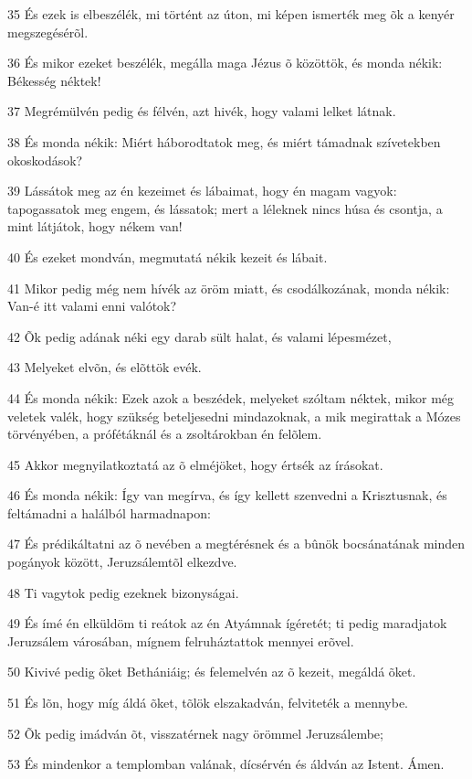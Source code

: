 \par 35 És ezek is elbeszélék, mi történt az úton, mi képen ismerték meg õk a kenyér megszegésérõl.
\par 36 És mikor ezeket beszélék, megálla maga Jézus õ közöttök, és monda nékik: Békesség néktek!
\par 37 Megrémülvén pedig és félvén, azt hivék, hogy valami lelket látnak.
\par 38 És monda nékik: Miért háborodtatok meg, és miért támadnak szívetekben okoskodások?
\par 39 Lássátok meg az én kezeimet és lábaimat, hogy én magam vagyok: tapogassatok meg engem, és lássatok; mert a léleknek nincs húsa és csontja, a mint látjátok, hogy nékem van!
\par 40 És ezeket mondván, megmutatá nékik kezeit és lábait.
\par 41 Mikor pedig még nem hívék az öröm miatt, és csodálkozának, monda nékik: Van-é itt valami enni valótok?
\par 42 Õk pedig adának néki egy darab sült halat, és valami lépesmézet,
\par 43 Melyeket elvõn, és elõttök evék.
\par 44 És monda nékik: Ezek azok a beszédek, melyeket szóltam néktek, mikor még veletek valék, hogy szükség beteljesedni mindazoknak, a mik megirattak a Mózes törvényében, a prófétáknál és a zsoltárokban én felõlem.
\par 45 Akkor megnyilatkoztatá az õ elméjöket, hogy értsék az írásokat.
\par 46 És monda nékik: Így van megírva, és így kellett szenvedni a Krisztusnak, és feltámadni a halálból harmadnapon:
\par 47 És prédikáltatni az õ nevében a megtérésnek és a bûnök bocsánatának minden pogányok között, Jeruzsálemtõl elkezdve.
\par 48 Ti vagytok pedig ezeknek bizonyságai.
\par 49 És ímé én elküldöm ti reátok az én Atyámnak ígéretét; ti pedig maradjatok Jeruzsálem városában, mígnem  felruháztattok mennyei erõvel.
\par 50 Kivivé pedig õket Bethániáig; és felemelvén az õ kezeit, megáldá õket.
\par 51 És lõn, hogy míg áldá õket, tõlök elszakadván, felviteték a mennybe.
\par 52 Õk pedig imádván õt, visszatérnek nagy örömmel Jeruzsálembe;
\par 53 És mindenkor a templomban valának, dícsérvén és áldván az Istent. Ámen.



